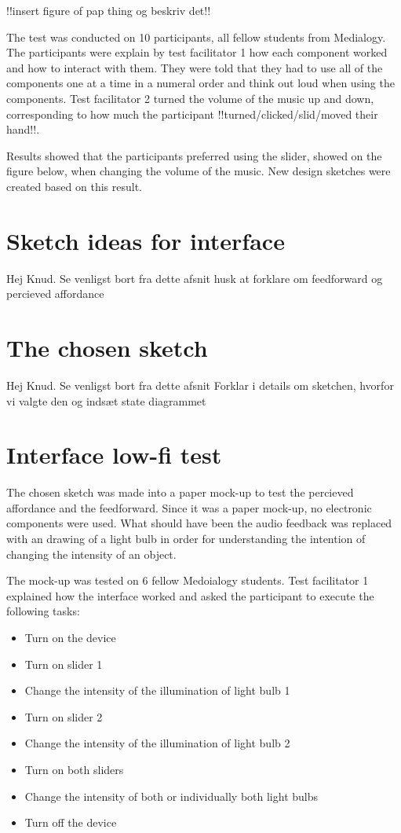 !!insert figure of pap thing og beskriv det!!

The test was conducted on 10 participants, all fellow students from Medialogy. The participants were explain by test facilitator 1 how each component worked and how to interact with them. They were told that they had to use all of the components one at a time in a numeral order and think out loud when using the components. Test facilitator 2 turned the volume of the music up and down, corresponding to how much the participant !!turned/clicked/slid/moved their hand!!.

Results showed that the participants preferred using the slider, showed on the figure below, when changing the volume of the music. New design sketches were created based on this result.

\section{Sketch ideas for interface}
Hej Knud. Se venligst bort fra dette afsnit
husk at forklare om feedforward og percieved affordance

\section{The chosen sketch}
Hej Knud. Se venligst bort fra dette afsnit
Forklar i details om sketchen, hvorfor vi valgte den og indsæt state diagrammet

\section{Interface low-fi test}
The chosen sketch was made into a paper mock-up to test the percieved affordance and the feedforward. Since it was a paper mock-up, no electronic components were used. What should have been the audio feedback was replaced with an drawing of a light bulb in order for understanding the intention of changing the intensity of an object. 

The mock-up was tested on 6 fellow Medoialogy students. Test facilitator 1 explained how the interface worked and asked the participant to execute the following tasks:

\begin{itemize}
\item Turn on the device
\item Turn on slider 1
\item Change the intensity of the illumination of light bulb 1
\item Turn on slider 2
\item Change the intensity of the illumination of light bulb 2
\item Turn on both sliders
\item Change the intensity of both or individually both light bulbs
\item Turn off the device
\end{itemize}

